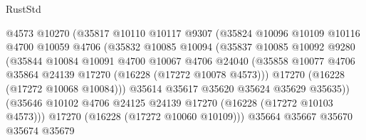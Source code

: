 \begin{lexlean}{RustStd}
\begin{coremodule}
                                @4573
                                @10270
                                (@35817
                                  @10110
                                  @10117
                                  @9307
                                  (@35824
                                    @10096
                                    @10109
                                    @10116
                                    @4700
                                    @10059
                                    @4706
                                    (@35832
                                      @10085
                                      @10094
                                      (@35837
                                        @10085
                                        @10092
                                        @9280
                                        (@35844
                                          @10084
                                          @10091
                                          @4700
                                          @10067
                                          @4706
                                          @24040
                                          (@35858
                                            @10077
                                            @4706
                                            @35864
                                            @24139
                                            @17270
                                            (@16228 (@17272 @10078 @4573)))
                                          @17270
                                          (@16228 (@17272 @10068 @10084)))
                                        @35614
                                        @35617
                                        @35620
                                        @35624
                                        @35629
                                        @35635))
                                    (@35646
                                      @10102
                                      @4706
                                      @24125
                                      @24139
                                      @17270
                                      (@16228 (@17272 @10103 @4573)))
                                    @17270
                                    (@16228 (@17272 @10060 @10109)))
                                  @35664
                                  @35667
                                  @35670
                                  @35674
                                  @35679

\end{coremodule}
\end{lexlean}
